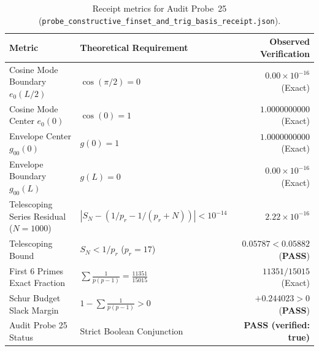 \documentclass[11pt,a4paper]{article}
\begin{document}
\begin{table}[h!]
\centering
\begin{tabular}{llr}
\toprule
\textbf{Metric} & \textbf{Theoretical Requirement} & \textbf{Observed Verification} \\
\midrule
Cosine Mode Boundary $e_0(L/2)$ & $\cos(\pi/2) = 0$ & $0.00 \times 10^{-16}$ (Exact) \\
Cosine Mode Center $e_0(0)$ & $\cos(0) = 1$ & $1.0000000000$ (Exact) \\
Envelope Center $g_{00}(0)$ & $g(0) = 1$ & $1.0000000000$ (Exact) \\
Envelope Boundary $g_{00}(L)$ & $g(L) = 0$ & $0.00 \times 10^{-16}$ (Exact) \\
Telescoping Series Residual ($N=1000$) & $|S_N - (1/p_r - 1/(p_r+N))| < 10^{-14}$ & $2.22 \times 10^{-16}$ \\
Telescoping Bound & $S_N < 1 / p_r$ ($p_r = 17$) & $0.05787 < 0.05882$ (\textbf{PASS}) \\
First 6 Primes Exact Fraction & $\sum \frac{1}{p(p-1)} = \frac{11351}{15015}$ & $11351/15015$ (Exact) \\
Schur Budget Slack Margin & $1 - \sum \frac{1}{p(p-1)} > 0$ & $+0.244023 > 0$ (\textbf{PASS}) \\
Audit Probe 25 Status & Strict Boolean Conjunction & \textbf{PASS (verified: true)} \\
\bottomrule
\end{tabular}
\caption{Receipt metrics for Audit Probe~25 (\texttt{probe\_constructive\_finset\_and\_trig\_basis\_receipt.json}).}
\end{table}
\end{document}
